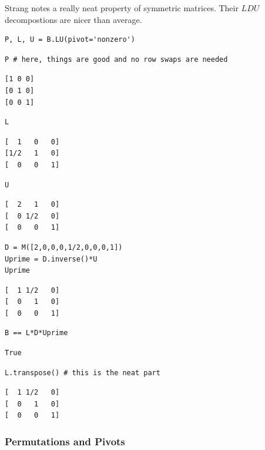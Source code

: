 \documentclass[10pt,]{book}
\theoremstyle{plain}
\theoremstyle{definition}
\numberwithin{equation}{section}
\begin{document}
        Strang notes a really neat property of symmetric matrices. Their
        \(LDU\) decompostions are nicer than average.
\begin{lstlisting}[style=sageinput]
P, L, U = B.LU(pivot='nonzero')
\end{lstlisting}
\begin{lstlisting}[style=sageinput]
P # here, things are good and no row swaps are needed
\end{lstlisting}
\begin{lstlisting}[style=sageoutput]
[1 0 0]
[0 1 0]
[0 0 1]
\end{lstlisting}
\begin{lstlisting}[style=sageinput]
L
\end{lstlisting}
\begin{lstlisting}[style=sageoutput]
[  1   0   0]
[1/2   1   0]
[  0   0   1]
\end{lstlisting}
\begin{lstlisting}[style=sageinput]
U
\end{lstlisting}
\begin{lstlisting}[style=sageoutput]
[  2   1   0]
[  0 1/2   0]
[  0   0   1]
\end{lstlisting}
\begin{lstlisting}[style=sageinput]
D = M([2,0,0,0,1/2,0,0,0,1])
Uprime = D.inverse()*U
Uprime
\end{lstlisting}
\begin{lstlisting}[style=sageoutput]
[  1 1/2   0]
[  0   1   0]
[  0   0   1]
\end{lstlisting}
\begin{lstlisting}[style=sageinput]
B == L*D*Uprime
\end{lstlisting}
\begin{lstlisting}[style=sageoutput]
True
\end{lstlisting}
\begin{lstlisting}[style=sageinput]
L.transpose() # this is the neat part
\end{lstlisting}
\begin{lstlisting}[style=sageoutput]
[  1 1/2   0]
[  0   1   0]
[  0   0   1]
\end{lstlisting}
\typeout{************************************************}
\typeout{************************************************}
\subsubsection[Permutations and Pivots]{Permutations and Pivots}\label{subsubsection-35}
\end{document}
